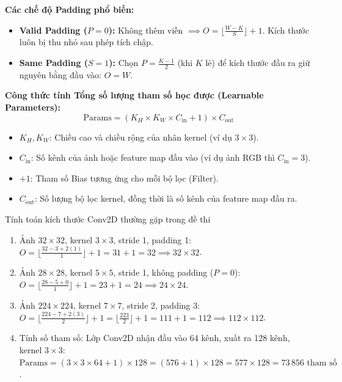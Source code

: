 \documentclass[10pt,a4paper]{article}
\begin{document}
\textbf{Các chế độ Padding phổ biến:}
\begin{itemize}[leftmargin=*]
    \item \textbf{Valid Padding ($P = 0$):} Không thêm viền $\implies O = \lfloor \frac{W - K}{S} \rfloor + 1$. Kích thước luôn bị thu nhỏ sau phép tích chập.
    \item \textbf{Same Padding ($S = 1$):} Chọn $P = \frac{K - 1}{2}$ (khi $K$ lẻ) để kích thước đầu ra giữ nguyên bằng đầu vào: $O = W$.
\end{itemize}

\textbf{Công thức tính Tổng số lượng tham số học được (Learnable Parameters):}
\begin{equation}
    \text{Params} = (K_H \times K_W \times C_{\text{in}} + 1) \times C_{\text{out}}
\end{equation}
\begin{itemize}[leftmargin=*]
    \item $K_H, K_W$: Chiều cao và chiều rộng của nhân kernel (ví dụ $3 \times 3$).
    \item $C_{\text{in}}$: Số kênh của ảnh hoặc feature map đầu vào (ví dụ ảnh RGB thì $C_{\text{in}} = 3$).
    \item $+1$: Tham số Bias tương ứng cho mỗi bộ lọc (Filter).
    \item $C_{\text{out}}$: Số lượng bộ lọc kernel, đồng thời là số kênh của feature map đầu ra.
\end{itemize}

\begin{examplebox}{Tính toán kích thước Conv2D thường gặp trong đề thi}
\begin{enumerate}[leftmargin=*]
    \item Ảnh $32 \times 32$, kernel $3 \times 3$, stride 1, padding 1:
    $O = \lfloor \frac{32 - 3 + 2(1)}{1} \rfloor + 1 = 31 + 1 = 32 \implies 32 \times 32$.
    \item Ảnh $28 \times 28$, kernel $5 \times 5$, stride 1, không padding ($P=0$):
    $O = \lfloor \frac{28 - 5 + 0}{1} \rfloor + 1 = 23 + 1 = 24 \implies 24 \times 24$.
    \item Ảnh $224 \times 224$, kernel $7 \times 7$, stride 2, padding 3:
    $O = \lfloor \frac{224 - 7 + 2(3)}{2} \rfloor + 1 = \lfloor \frac{223}{2} \rfloor + 1 = 111 + 1 = 112 \implies 112 \times 112$.
    \item Tính số tham số: Lớp Conv2D nhận đầu vào 64 kênh, xuất ra 128 kênh, kernel $3 \times 3$:
    $\text{Params} = (3 \times 3 \times 64 + 1) \times 128 = (576 + 1) \times 128 = 577 \times 128 = 73\,856\text{ tham số}$.
\end{enumerate}
\end{examplebox}
\end{document}
